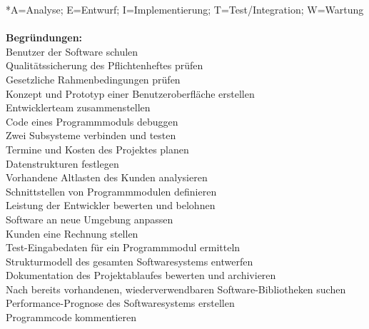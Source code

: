 \documentclass[a4paper,11pt]{scrartcl}
\begin{document}
	*A=Analyse; E=Entwurf; I=Implementierung; T=Test/Integration; W=Wartung\\
	\\\textbf{Begründungen:}\\
	Benutzer der Software schulen\\
	Qualitätssicherung des Pflichtenheftes prüfen\\
	Gesetzliche Rahmenbedingungen prüfen\\
	Konzept und Prototyp einer Benutzeroberfläche erstellen\\
	Entwicklerteam zusammenstellen\\
	Code eines Programmmoduls debuggen\\						
 	Zwei Subsysteme verbinden und testen\\			
 	Termine und Kosten des Projektes planen\\		
	Datenstrukturen festlegen\\				
	Vorhandene Altlasten des Kunden analysieren\\			
	Schnittstellen von Programmmodulen definieren\\			
	Leistung der Entwickler bewerten und belohnen\\			
	Software an neue Umgebung anpassen\\		
	Kunden eine Rechnung stellen\\				
	Test-Eingabedaten für ein Programmmodul ermitteln\\	
	Strukturmodell des gesamten Softwaresystems entwerfen\\
	Dokumentation des Projektablaufes bewerten und archivieren\\	
	Nach bereits vorhandenen, wiederverwendbaren Software-Bibliotheken suchen\\
	Performance-Prognose des Softwaresystems erstellen\\
	Programmcode kommentieren\\	
	
	
	
\end{document}

